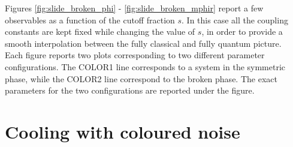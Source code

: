 Figures \ref{fig:slide_broken_phi} - \ref{fig:slide_broken_mphir} report a few observables as a function of the cutoff fraction $s$. In this case all the coupling constants are kept fixed while changing the value of $s$, in order to provide a smooth interpolation between the fully classical and fully quantum picture. \\
Each figure reports two plots corresponding to two different parameter configurations. The COLOR1 line corresponds to a system in the symmetric phase, while the COLOR2 line correspond to the broken phase. The exact parameters for the two configurations are reported under the figure.


\section{Cooling with coloured noise}

